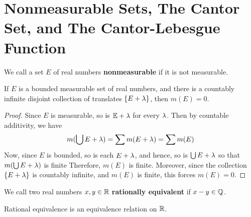 \section{Nonmeasurable Sets, The Cantor Set, and The Cantor-Lebesgue Function}

\begin{definition}
    We call a set $E$ of real numbers  \textbf{nonmeasurable} if it is not
    measurable.
\end{definition}

\begin{lemma}\label{2.5.1}
    If $E$ is a bounded measurable set of real numbers, and
    there is a countably infinite disjoint collection of translates  $\{E+\lambda\}$,
    then $m(E)=0$.
\end{lemma}
\begin{proof}
    Since $E$ is measurable, so is  $\mathbb{E}+\lambda$ for every  $\lambda$. Then by countable
    additivity, we have
    \begin{equation*}
        m(\bigcup{E+\lambda})=\sum{m(E+\lambda)}=\sum{m(E)}
    \end{equation*}
    Now, since $E$ is bounded, so is each  $E+\lambda$, and hence, so is
    $\bigcup{E+\lambda}$ so that $m(\bigcup{E+\lambda})$ is finite Therefore, $m(E)$ is
    finite. Moreover, since the collection $\{E+\lambda\}$ is countably infinite,
    and $m(E)$ is finite, this forces $m(E)=0$.
\end{proof}

\begin{definition}
    We call two real numbers $x,y \in \mathbb{R}$ \textbf{rationally equivalent} if
    $x-y \in \mathbb{Q}$.
\end{definition}

\begin{lemma}\label{2.5.2}
    Rational equivalence is an equivalence relation on $\mathbb{R}$.
\end{lemma}

